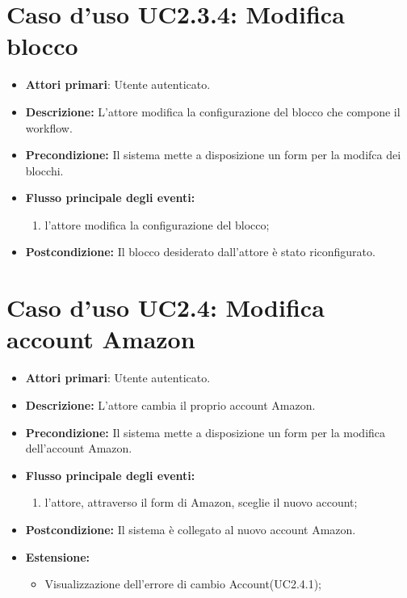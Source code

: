 {{{\section{Caso d'uso UC2.3.4: Modifica blocco }
\begin{itemize}
	\item \textbf{Attori primari}: Utente autenticato.
	\item \textbf{Descrizione:} L'attore modifica la configurazione del blocco che compone il workflow.
	\item \textbf{Precondizione:} Il sistema mette a disposizione un form per la modifca dei blocchi.
	\item \textbf{Flusso principale degli eventi:}
	\begin{enumerate}
		\item l'attore modifica la configurazione del blocco;
	\end{enumerate}
	\item \textbf{Postcondizione:} Il blocco desiderato dall'attore è stato riconfigurato.
\end{itemize}
\section{Caso d'uso UC2.4: Modifica account Amazon }
\begin{itemize}
	\item \textbf{Attori primari}: Utente autenticato.
	\item \textbf{Descrizione:} L'attore cambia il proprio account Amazon.
	\item \textbf{Precondizione:} Il sistema mette a disposizione un form per la modifica dell'account Amazon.
	\item \textbf{Flusso principale degli eventi:}
	\begin{enumerate}
		\item l'attore, attraverso il form di Amazon, sceglie il nuovo account;
	\end{enumerate}
	\item \textbf{Postcondizione:} Il sistema è collegato al nuovo account Amazon.
	\item \textbf{Estensione:}
	\begin{itemize}
		\item Visualizzazione dell'errore di cambio Account(UC2.4.1);
	\end{itemize}
\end{itemize}
}}}
